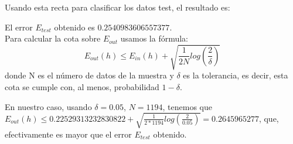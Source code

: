 \documentclass{article}
\begin{document}
Usando esta recta para clasificar los datos test, el resultado es:

\begin{figure}[H]
  \centering
\end{figure}

El error $E_{test}$ obtenido es $0.2540983606557377$.\\

Para calcular la cota sobre $E_{out}$ usamos la fórmula:
$$E_{out}(h) \leq E_{in}(h) + \sqrt{\frac{1}{2N}log(\frac{2}{\delta})} $$
donde N es el número de datos de la muestra y $\delta$ es la tolerancia, es decir, esta cota se cumple con, al menos, probabilidad $1-\delta$.

En nuestro caso, usando $\delta = 0.05$, $N=1194$, tenemos que $E_{out}(h) \leq 0.22529313232830822 + \sqrt{\frac{1}{2*1194}log(\frac{2}{0.05})} = 0.2645965277$, que, efectivamente es mayor que el error $E_{test}$ obtenido.
\end{document}
